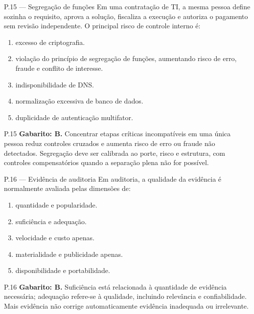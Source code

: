 \begin{questao}{ P.15 — Segregação de funções}
Em uma contratação de TI, a mesma pessoa define sozinha o requisito, aprova a solução, fiscaliza a execução e autoriza o pagamento sem revisão independente. O principal risco de controle interno é:
\begin{enumerate}[label=\Alph*)]
\item excesso de criptografia.
\item violação do princípio de segregação de funções, aumentando risco de erro, fraude e conflito de interesse.
\item indisponibilidade de DNS.
\item normalização excessiva de banco de dados.
\item duplicidade de autenticação multifator.
\end{enumerate}
\end{questao}
\begin{solucao}{P.15}
\textbf{Gabarito: B.} Concentrar etapas críticas incompatíveis em uma única pessoa reduz controles cruzados e aumenta risco de erro ou fraude não detectados. Segregação deve ser calibrada ao porte, risco e estrutura, com controles compensatórios quando a separação plena não for possível.
\end{solucao}

\begin{questao}{ P.16 — Evidência de auditoria}
Em auditoria, a qualidade da evidência é normalmente avaliada pelas dimensões de:
\begin{enumerate}[label=\Alph*)]
\item quantidade e popularidade.
\item suficiência e adequação.
\item velocidade e custo apenas.
\item materialidade e publicidade apenas.
\item disponibilidade e portabilidade.
\end{enumerate}
\end{questao}
\begin{solucao}{P.16}
\textbf{Gabarito: B.} Suficiência está relacionada à quantidade de evidência necessária; adequação refere-se à qualidade, incluindo relevância e confiabilidade. Mais evidência não corrige automaticamente evidência inadequada ou irrelevante.
\end{solucao}

